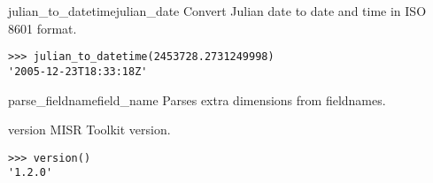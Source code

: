 \documentclass{howto}
\begin{document}
\begin{funcdesc}{julian_to_datetime}{julian_date}
    Convert Julian date to date and time in ISO 8601 format.

\begin{verbatim}
>>> julian_to_datetime(2453728.2731249998)
'2005-12-23T18:33:18Z'
\end{verbatim}
\end{funcdesc}

\begin{funcdesc}{parse_fieldname}{field_name}
    Parses extra dimensions from fieldnames.
\end{funcdesc}

\begin{funcdesc}{version}{}
    MISR Toolkit version.

\begin{verbatim}
>>> version()
'1.2.0'
\end{verbatim}
\end{funcdesc}
\end{document}
